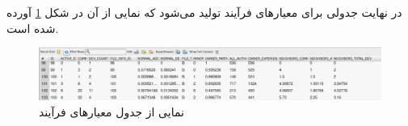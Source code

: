 در نهایت جدولی برای معیارهای فرآیند تولید می‌شود که نمایی از آن در شکل \ref{fig:process-metics} آورده شده است. 
\begin{figure}[H]
	\centering
	\includegraphics[width=1\textwidth]{img/case_study/process-metrics.png}
	\caption{نمایی از جدول معیارهای فرآیند }
	\label{fig:process-metics}
\end{figure}



